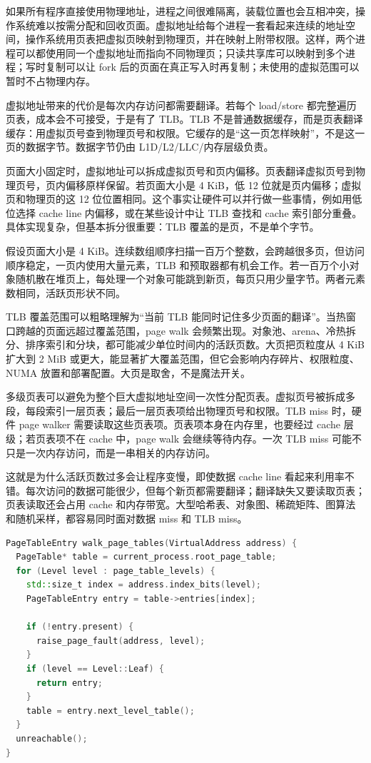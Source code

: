 如果所有程序直接使用物理地址，进程之间很难隔离，装载位置也会互相冲突，操作系统难以按需分配和回收页面。虚拟地址给每个进程一套看起来连续的地址空间，操作系统用页表把虚拟页映射到物理页，并在映射上附带权限。这样，两个进程可以都使用同一个虚拟地址而指向不同物理页；只读共享库可以映射到多个进程；写时复制可以让 fork 后的页面在真正写入时再复制；未使用的虚拟范围可以暂时不占物理内存。

虚拟地址带来的代价是每次内存访问都需要翻译。若每个 load/store 都完整遍历页表，成本会不可接受，于是有了 TLB。TLB 不是普通数据缓存，而是页表翻译缓存：用虚拟页号查到物理页号和权限。它缓存的是“这一页怎样映射”，不是这一页的数据字节。数据字节仍由 L1D/L2/LLC/内存层级负责。

页面大小固定时，虚拟地址可以拆成虚拟页号和页内偏移。页表翻译虚拟页号到物理页号，页内偏移原样保留。若页面大小是 4 KiB，低 12 位就是页内偏移；虚拟页和物理页的这 12 位位置相同。这个事实让硬件可以并行做一些事情，例如用低位选择 cache line 内偏移，或在某些设计中让 TLB 查找和 cache 索引部分重叠。具体实现复杂，但基本拆分很重要：TLB 覆盖的是页，不是单个字节。

假设页面大小是 4 KiB。连续数组顺序扫描一百万个整数，会跨越很多页，但访问顺序稳定，一页内使用大量元素，TLB 和预取器都有机会工作。若一百万个小对象随机散在堆页上，每处理一个对象可能跳到新页，每页只用少量字节。两者元素数相同，活跃页形状不同。

TLB 覆盖范围可以粗略理解为“当前 TLB 能同时记住多少页面的翻译”。当热窗口跨越的页面远超过覆盖范围，page walk 会频繁出现。对象池、arena、冷热拆分、排序索引和分块，都可能减少单位时间内的活跃页数。大页把页粒度从 4 KiB 扩大到 2 MiB 或更大，能显著扩大覆盖范围，但它会影响内存碎片、权限粒度、NUMA 放置和部署配置。大页是取舍，不是魔法开关。

多级页表可以避免为整个巨大虚拟地址空间一次性分配页表。虚拟页号被拆成多段，每段索引一层页表；最后一层页表项给出物理页号和权限。TLB miss 时，硬件 page walker 需要读取这些页表项。页表项本身在内存里，也要经过 cache 层级；若页表项不在 cache 中，page walk 会继续等待内存。一次 TLB miss 可能不只是一次内存访问，而是一串相关的内存访问。

这就是为什么活跃页数过多会让程序变慢，即使数据 cache line 看起来利用率不错。每次访问的数据可能很少，但每个新页都需要翻译；翻译缺失又要读取页表；页表读取还会占用 cache 和内存带宽。大型哈希表、对象图、稀疏矩阵、图算法和随机采样，都容易同时面对数据 miss 和 TLB miss。

\begin{lstlisting}[language=C++,caption={多级页表查找的抽象伪代码}]
PageTableEntry walk_page_tables(VirtualAddress address) {
  PageTable* table = current_process.root_page_table;
  for (Level level : page_table_levels) {
    std::size_t index = address.index_bits(level);
    PageTableEntry entry = table->entries[index];

    if (!entry.present) {
      raise_page_fault(address, level);
    }
    if (level == Level::Leaf) {
      return entry;
    }
    table = entry.next_level_table();
  }
  unreachable();
}
\end{lstlisting}

